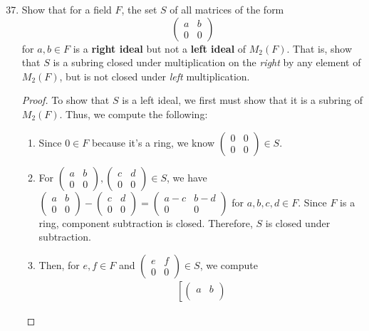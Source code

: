 \documentclass[12pt, oneside]{book}
\newcommand{\pf}[1]{
    \begin{customframedproof}[linecolor=orangehdx!75]
        \begin{proof}
        #1
        \end{proof}
    \end{customframedproof}
}
\begin{document}
\begin{enumerate}
	\setcounter{enumi}{36}
	\item Show that for a field \(F\), the set \(S\) of all matrices of the form
	\[\begin{pmatrix}
		a & b \\
		0 & 0
	\end{pmatrix}\]
	for \(a,b \in F\) is a \textbf{right ideal} but not a \textbf{left ideal} of \(M_{2}(F)\). That is, show that \(S\) is a subring closed under multiplication on the \textit{right} by any element of \(M_{2}(F)\), but is not closed under \textit{left} multiplication.
	\pf{
		To show that \(S\) is a left ideal, we first must show that it is a subring of \(M_{2}(F)\). Thus, we compute the following:
		\begin{enumerate}[label=(\arabic*)]
			\item Since \(0 \in F\) because it's a ring, we know \(\begin{pmatrix}
				0 & 0 \\
				0 & 0 
			\end{pmatrix} \in S\).
			\item For \(\begin{pmatrix}
				a & b \\
				0 & 0
			\end{pmatrix}, \begin{pmatrix}
				c & d \\
				0 & 0
			\end{pmatrix} \in S\), we have \(\begin{pmatrix}
				a & b \\
				0 & 0
			\end{pmatrix} - \begin{pmatrix}
				c & d \\
				0 & 0
			\end{pmatrix} = \begin{pmatrix}
				a - c & b - d \\
				0 & 0
			\end{pmatrix}\) for \(a,b,c,d \in F\). Since \(F\) is a ring, component subtraction is closed. Therefore, \(S\) is closed under subtraction. 
			\item Then, for \(e,f \in F\) and \(\begin{pmatrix}
				e & f \\
				0 & 0
			\end{pmatrix} \in S\), we compute
			\begin{align*}
				\left[
					\begin{pmatrix}
						a & b \\

\end{pmatrix}
\end{align*}
\end{enumerate}}
\end{enumerate}
\end{document}
